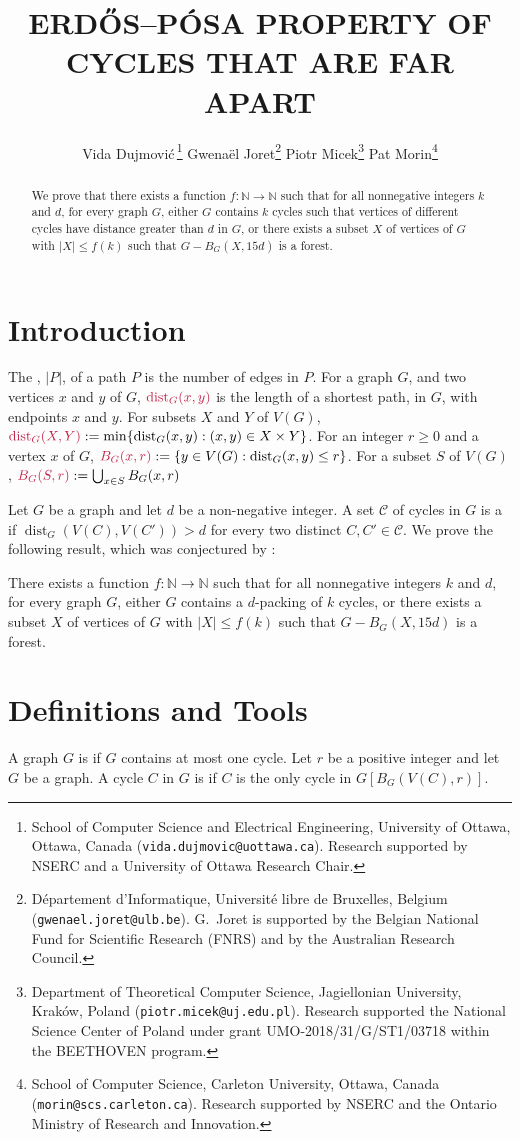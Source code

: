 \documentclass{patmorin}
\title{\MakeUppercase{{E}rdős–{P}ósa property of cycles that are far apart}}
\author{
 Vida Dujmovi{\'c}\,\footnote{School of Computer Science and Electrical Engineering, University of Ottawa, Ottawa, Canada (\texttt{vida.dujmovic@uottawa.ca}). Research supported by NSERC and a University of Ottawa Research Chair.}
 \qquad
 Gwena\"el Joret\footnote{D\'epartement d'Informatique, Universit\'e libre de Bruxelles, Belgium ({\tt gwenael.joret@ulb.be}). G.\ Joret is supported by the Belgian National Fund for Scientific Research (FNRS) and by the Australian Research Council.}
 \qquad
 Piotr Micek\footnote{Department of Theoretical Computer Science, Jagiellonian University, Kraków, Poland (\texttt{piotr.micek@uj.edu.pl}). Research supported
 the National Science Center of Poland under grant UMO-2018/31/G/ST1/03718 within the BEETHOVEN program.}
 \qquad
 Pat Morin\footnote{School of Computer Science, Carleton University, Ottawa, Canada (\texttt{morin@scs.carleton.ca}). Research supported by NSERC and the Ontario Ministry of Research and Innovation.}}
\date{}
\DeclareMathOperator{\dist}{dist}
\begin{document}
\maketitle

\begin{abstract}
  We prove that there exists a function $f:\mathbb{N}\to\mathbb{N}$ such that for all nonnegative integers $k$ and $d$,  for every graph $G$,  either $G$ contains $k$ cycles such that vertices of different cycles have distance greater than $d$ in $G$, or there exists a subset $X$ of vertices of $G$ with $|X|\leq f(k)$ such that  $G-B_G(X,15d)$ is a forest.
\end{abstract}

\section{Introduction}

The , $|P|$, of a path $P$ is the number of edges in $P$.  For a graph $G$, and two vertices $x$ and $y$ of $G$, $\mathdefin{\dist_G(x,y)}$ is the length of a shortest path, in $G$, with endpoints $x$ and $y$.  For subsets $X$ and $Y$ of $V(G)$, $\mathdefin{\dist_G(X,Y)}:=\min\{\dist_G(x,y):(x,y)\in X\times Y\}$. For an integer $r\ge 0$ and a vertex $x$ of $G$, $\mathdefin{B_G(x,r)}:=\{y\in V(G):\dist_G(x,y)\le r\}$.  For a subset $S$ of $V(G)$, $\mathdefin{B_G(S,r)}:=\bigcup_{x\in S}B_G(x,r)$

Let $G$ be a graph and let $d$ be a non-negative integer.
A set $\mathcal{C}$ of cycles in $G$ is a  if $\dist_G(V(C),V(C'))> d$ for every two distinct $C,C'\in\mathcal{C}$.  We prove the following result, which was conjectured by \citet{ahn.gollin:coarse}:

\begin{thm}\label{thm:main-in-intro}
  There exists a function $f:\mathbb{N}\to\mathbb{N}$ such that for all nonnegative integers $k$ and $d$,  for every graph $G$,  either $G$ contains a $d$-packing of $k$ cycles, or  there exists a subset $X$ of vertices of $G$ with $|X|\leq f(k)$ such that  $G-B_G(X,15d)$ is a forest.
\end{thm}


\section{Definitions and Tools}

A graph $G$ is  if $G$ contains at most one cycle.  Let $r$ be a positive integer and let $G$ be a graph.
A cycle $C$ in $G$ is 
if $C$ is the only cycle in $G[B_G(V(C),r)]$.
\end{document}
